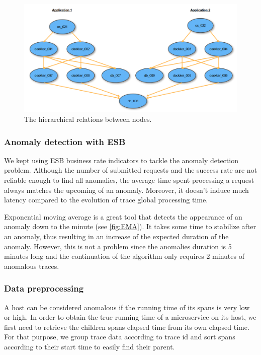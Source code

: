 \documentclass[acmsmall, screen, nonacm]{acmart}
\begin{document}
\begin{figure}[h!]
  \centering
  \includegraphics[width=\textwidth]{images/Call_chain_host.png}
  \caption{The hierarchical relations between nodes.}
  \label{fig:Call_chain_host}
\end{figure}

\subsubsection*{Anomaly detection with ESB}
We kept using ESB business rate indicators to tackle the anomaly detection problem. Although the number of submitted requests and the success rate are not reliable enough to find all anomalies, the average time spent processing a request always matches the upcoming of an anomaly. Moreover, it doesn't induce much latency compared to the evolution of trace global processing time.




Exponential moving average is a great tool that detects the appearance of an anomaly down to the minute (see \autoref{fig:EMA}). It takes some time to stabilize after an anomaly, thus resulting in an increase of the expected duration of the anomaly. However, this is not a problem since the anomalies duration is 5 minutes long and the continuation of the algorithm only requires 2 minutes of anomalous traces.

\newpage
\subsubsection*{Data preprocessing}
A host can be considered anomalous if the running time of its spans is very low or high. In order to obtain the true running time of a microservice on its host, we first need to retrieve the children spans elapsed time from its own elapsed time. For that purpose, we group trace data according to trace id and sort spans according to their start time to easily find their parent.
\\
\end{document}

